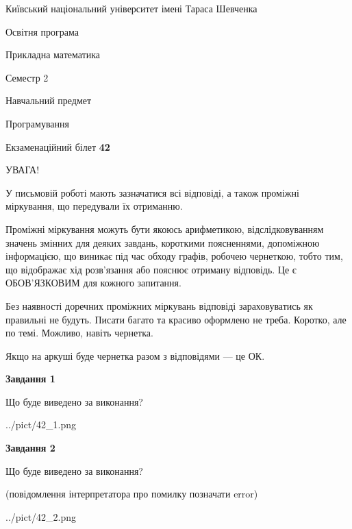 \documentclass[12pt, ukrainian]{article}
\begin{document}
{{\begin {small}\par
{ \center  Київський національний університет імені Тараса Шевченка \par}
{\parbox {5 cm}{Освітня програма \hfill}{\parbox {7 cm}{Прикладна математика\hfill}}\parbox {6 cm}{\hfill Семестр 2}}\par
{\parbox {5 cm} {Навчальний предмет \hfill}\parbox {7 cm}{Програмування \hfill}\parbox {6cm}{\hfill}\par}\vspace{-7pt} \end{small}}{\center Екзаменаційний білет \No \textbf
{ 42 }\par}}
{
\begin {large}
УВАГА!

У письмовій роботі мають зазначатися всі відповіді, а також проміжні міркування, що передували їх отриманню.

Проміжні міркування можуть бути якоюсь арифметикою, відслідковуванням зна\-чень змінних для деяких завдань,
короткими поясненнями, допоміжною інформацією, що виникає під час обходу графів, робочею чернеткою,
тобто тим, що відображає хід розв’язання або пояснює отриману відповідь.
Це є ОБОВ’ЯЗКОВИМ для кожного запитання.

Без наявності доречних проміжних міркувань відповіді зараховуватись як правиль\-ні не будуть.
Писати багато та красиво оформлено не треба. Коротко, але по темі. Можли\-во, навіть чернетка.

Якщо на аркуші буде чернетка разом з відповідями --- це ОК.

\newpage

{\begin {center}\textbf{Завдання 1}\end {center}}\par
Що буде виведено за виконання?\par
\begin{center}
	{../pict/42_1.png}
\end{center}
\newpage

{\begin {center}\textbf{Завдання 2}\end {center}}\par
Що буде виведено за виконання?\par
 (повідомлення інтерпретатора про помилку позначати error)\par
\begin{center}
	{../pict/42_2.png}
\end{center}
\newpage


\end{large}}
\end{document}
